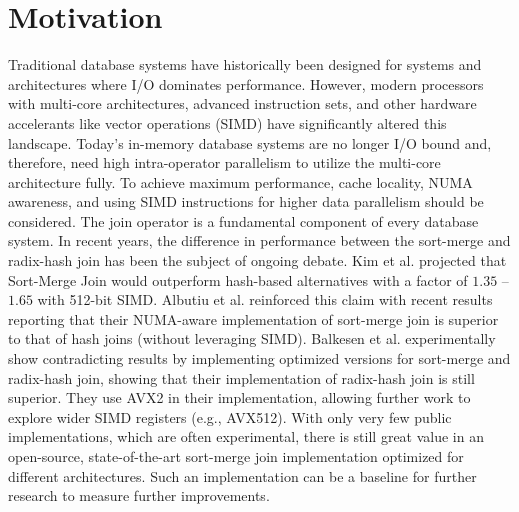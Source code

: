 \section{Motivation}
\label{sec:motivation}

Traditional database systems have historically been designed for systems and architectures where
I/O dominates performance. However, modern processors with multi-core architectures, advanced 
instruction sets, and other hardware accelerants like vector operations (SIMD) have significantly 
altered this landscape. Today's in-memory database systems are no longer I/O bound and, therefore,
need high intra-operator parallelism to utilize the multi-core architecture fully. To achieve
maximum performance, cache locality, NUMA awareness, and using SIMD instructions for higher data
parallelism should be considered.
The join operator is a fundamental component of every database system.
In recent years, the difference in performance between the sort-merge and radix-hash join has been
the subject of ongoing debate. Kim et al. \cite{10.14778/1687553.1687564} projected that Sort-Merge Join would outperform hash-based
alternatives with a factor of $1.35$ – $1.65$ with 512-bit SIMD. Albutiu et al. \cite{MPSM} reinforced this claim with recent results reporting that
their NUMA-aware implementation of sort-merge join is superior to that of hash joins (without
leveraging SIMD). Balkesen et al. \cite{Balkesen} experimentally show contradicting results by implementing 
optimized versions for sort-merge and radix-hash join, showing that their implementation of
radix-hash join is still superior. They use AVX2 in their implementation, allowing further
work to explore wider SIMD registers (e.g., AVX512). With only very few public implementations,
which are often experimental, there is still great value in an open-source, state-of-the-art 
sort-merge join implementation optimized for different architectures. Such an implementation can
be a baseline for further research to measure further improvements.


